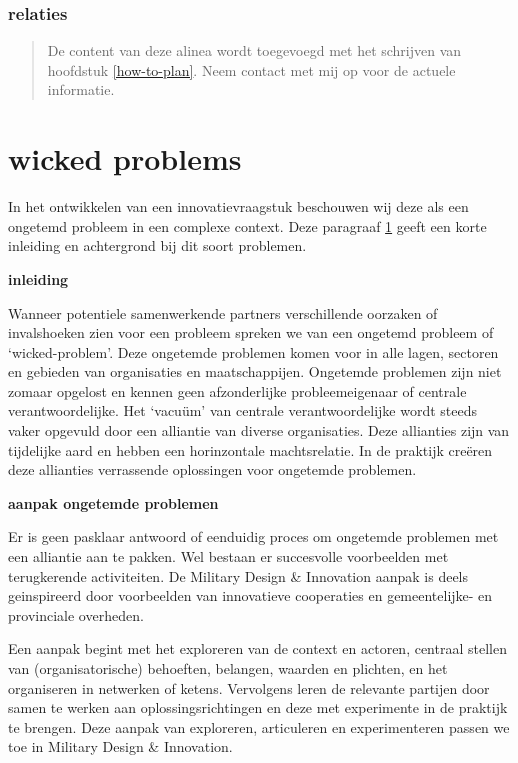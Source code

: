 \documentclass[
]{book}
\begin{document}
\hypertarget{relaties}{%
\subsubsection{relaties}\label{relaties}}

\begin{quote}
De content van deze alinea wordt toegevoegd met het schrijven van hoofdstuk \ref{how-to-plan}. Neem contact met mij op voor de actuele informatie.
\end{quote}

\hypertarget{wicked-problems}{%
\section{wicked problems}\label{wicked-problems}}

In het ontwikkelen van een innovatievraagstuk beschouwen wij deze als een ongetemd probleem in een complexe context. Deze paragraaf \ref{wicked-problems} geeft een korte inleiding en achtergrond bij dit soort problemen.

\textbf{inleiding}

Wanneer potentiele samenwerkende partners verschillende oorzaken of invalshoeken zien voor een probleem spreken we van een ongetemd probleem of `wicked-problem'. Deze ongetemde problemen komen voor in alle lagen, sectoren en gebieden van organisaties en maatschappijen. Ongetemde problemen zijn niet zomaar opgelost en kennen geen afzonderlijke probleemeigenaar of centrale verantwoordelijke. Het `vacuüm' van centrale verantwoordelijke wordt steeds vaker opgevuld door een alliantie van diverse organisaties. Deze allianties zijn van tijdelijke aard en hebben een horinzontale machtsrelatie. In de praktijk creëren deze allianties verrassende oplossingen voor ongetemde problemen.

\textbf{aanpak ongetemde problemen}

Er is geen pasklaar antwoord of eenduidig proces om ongetemde problemen met een alliantie aan te pakken. Wel bestaan er succesvolle voorbeelden met terugkerende activiteiten. De Military Design \& Innovation aanpak is deels geinspireerd door voorbeelden van innovatieve cooperaties en gemeentelijke- en provinciale overheden.

Een aanpak begint met het exploreren van de context en actoren, centraal stellen van (organisatorische) behoeften, belangen, waarden en plichten, en het organiseren in netwerken of ketens. Vervolgens leren de relevante partijen door samen te werken aan oplossingsrichtingen en deze met experimente in de praktijk te brengen. Deze aanpak van exploreren, articuleren en experimenteren passen we toe in Military Design \& Innovation.
\end{document}
